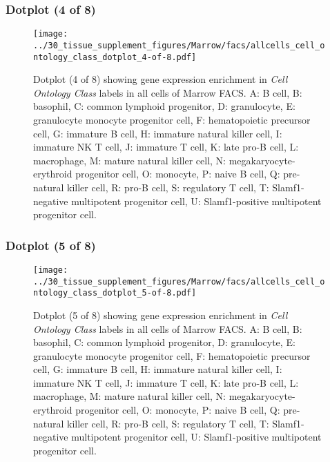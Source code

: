 \subsubsection{Dotplot (4 of 8)}
\begin{figure}[h]
\centering
\texttt{[image: ../30\_tissue\_supplement\_figures/Marrow/facs/allcells\_cell\_ontology\_class\_dotplot\_4-of-8.pdf]}

\caption{ Dotplot (4 of 8)  showing gene expression enrichment in \emph{Cell Ontology Class} labels in all cells of Marrow FACS. A: B cell, B: basophil, C: common lymphoid progenitor, D: granulocyte, E: granulocyte monocyte progenitor cell, F: hematopoietic precursor cell, G: immature B cell, H: immature natural killer cell, I: immature NK T cell, J: immature T cell, K: late pro-B cell, L: macrophage, M: mature natural killer cell, N: megakaryocyte-erythroid progenitor cell, O: monocyte, P: naive B cell, Q: pre-natural killer cell, R: pro-B cell, S: regulatory T cell, T: Slamf1-negative multipotent progenitor cell, U: Slamf1-positive multipotent progenitor cell.}
\end{figure}


\clearpage

\subsubsection{Dotplot (5 of 8)}
\begin{figure}[h]
\centering
\texttt{[image: ../30\_tissue\_supplement\_figures/Marrow/facs/allcells\_cell\_ontology\_class\_dotplot\_5-of-8.pdf]}

\caption{ Dotplot (5 of 8)  showing gene expression enrichment in \emph{Cell Ontology Class} labels in all cells of Marrow FACS. A: B cell, B: basophil, C: common lymphoid progenitor, D: granulocyte, E: granulocyte monocyte progenitor cell, F: hematopoietic precursor cell, G: immature B cell, H: immature natural killer cell, I: immature NK T cell, J: immature T cell, K: late pro-B cell, L: macrophage, M: mature natural killer cell, N: megakaryocyte-erythroid progenitor cell, O: monocyte, P: naive B cell, Q: pre-natural killer cell, R: pro-B cell, S: regulatory T cell, T: Slamf1-negative multipotent progenitor cell, U: Slamf1-positive multipotent progenitor cell.}
\end{figure}


\clearpage

